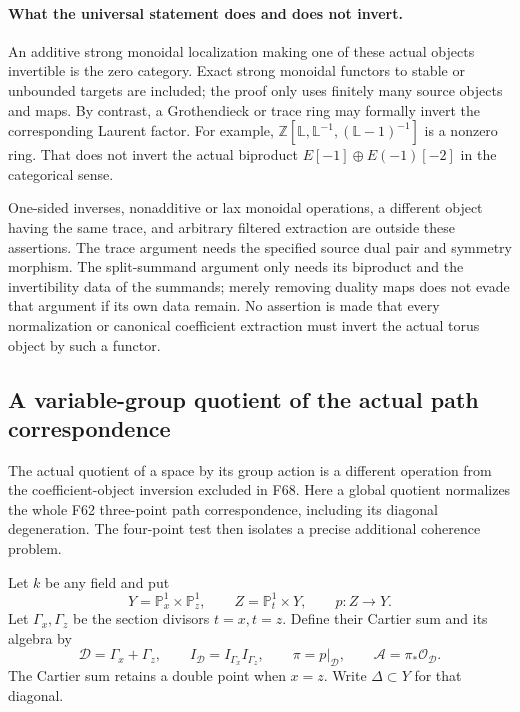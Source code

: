 \documentclass[11pt,a4paper]{article}
\newcommand{\mathscr}{\mathcal}
\newcommand{\fid}[1]{\textsf{#1}}\newcommand{\gate}[1]{\textsf{#1}}
\theoremstyle{named}\newtheorem{finding}{Finding}[section]
\theoremstyle{definition}\newtheorem{definition}[finding]{Definition}
\theoremstyle{remark}\newtheorem{remark}[finding]{Remark}
\begin{document}
\paragraph{What the universal statement does and does not invert.}
An additive strong monoidal localization making
one of these actual objects invertible is the
zero category. Exact strong monoidal functors
to stable or unbounded targets are included;
the proof only uses finitely many source objects
and maps.
By contrast, a Grothendieck or trace ring may
formally invert the corresponding Laurent factor.
For example,
\(\mathbb Z[\mathbb L,\mathbb L^{-1},
(\mathbb L-1)^{-1}]\) is a nonzero ring.
That does not invert the actual biproduct
\(E[-1]\oplus E(-1)[-2]\) in the categorical sense.

One-sided inverses, nonadditive or lax monoidal
operations, a different object having the same trace,
and arbitrary filtered extraction are outside
these assertions.
The trace argument needs the specified source
dual pair and symmetry morphism.
The split-summand argument only needs its biproduct
and the invertibility data of the summands; merely
removing duality maps does not evade that argument
if its own data remain.
No assertion is made that every normalization
or canonical coefficient extraction must invert
the actual torus object by such a functor.

\subsection{A variable-group quotient of the actual path correspondence}

The actual quotient of a space by its group action
is a different operation from the coefficient-object
inversion excluded in \fid{F68}.
Here a global quotient normalizes the whole
\fid{F62} three-point path correspondence, including
its diagonal degeneration. The four-point test
then isolates a precise additional coherence problem.

Let \(k\) be any field and put
\[
 Y=\mathbb P^1_x\times\mathbb P^1_z,\qquad
 Z=\mathbb P^1_t\times Y,\qquad p:Z\to Y.
\]
Let \(\Gamma_x,\Gamma_z\) be the section divisors
\(t=x,t=z\). Define their Cartier sum and its algebra by
\begin{equation}\label{eq:variableQuotientDivisor}
 \mathscr D=\Gamma_x+\Gamma_z,\qquad
 I_{\mathscr D}=I_{\Gamma_x}I_{\Gamma_z},\qquad
 \pi=p|_{\mathscr D},\qquad
 \mathcal A=\pi_*\mathcal O_{\mathscr D}.
\end{equation}
The Cartier sum retains a double point when \(x=z\).
Write \(\Delta\subset Y\) for that diagonal.
\end{document}
